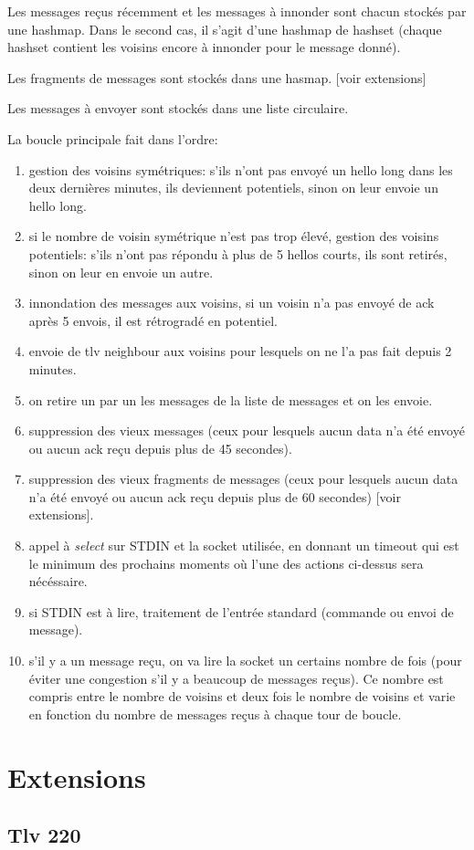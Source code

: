 \documentclass[a4paper,10pt]{article} %
\begin{document}
Les messages reçus récemment et les messages à innonder sont chacun stockés par une hashmap. Dans le second cas, il s'agit d'une hashmap de hashset (chaque hashset contient les voisins encore à innonder pour le message donné).

Les fragments de messages sont stockés dans une hasmap. [voir extensions]

Les messages à envoyer sont stockés dans une liste circulaire.

La boucle principale fait dans l'ordre:
\begin{enumerate}
\item gestion des voisins symétriques: s'ils n'ont pas envoyé un hello long dans les deux dernières minutes, ils deviennent potentiels, sinon on leur envoie un hello long.
\item si le nombre de voisin symétrique n'est pas trop élevé, gestion des voisins potentiels: s'ils n'ont pas répondu à plus de 5 hellos courts, ils sont retirés, sinon on leur en envoie un autre.
\item innondation des messages aux voisins, si un voisin n'a pas envoyé de ack après 5 envois, il est rétrogradé en potentiel.
\item envoie de tlv neighbour aux voisins pour lesquels on ne l'a pas fait depuis 2 minutes.
\item on retire un par un les messages de la liste de messages et on les envoie.
\item suppression des vieux messages (ceux pour lesquels aucun data n'a été envoyé ou aucun ack reçu depuis plus de 45 secondes).
\item suppression des vieux fragments de messages (ceux pour lesquels aucun data n'a été envoyé ou aucun ack reçu depuis plus de 60 secondes) [voir extensions].
\item appel à \textit{select} sur STDIN et la socket utilisée, en donnant un timeout qui est le minimum des prochains moments où l'une des actions ci-dessus sera nécéssaire.
\item si STDIN est à lire, traitement de l'entrée standard (commande ou envoi de message).
\item s'il y a un message reçu, on va lire la socket un certains nombre de fois (pour éviter une congestion s'il y a beaucoup de messages reçus). Ce nombre est compris entre le nombre de voisins et deux fois le nombre de voisins et varie en fonction du nombre de messages reçus à chaque tour de boucle.
\end{enumerate}

\section{Extensions}
\subsection{Tlv 220}

\end{document}
